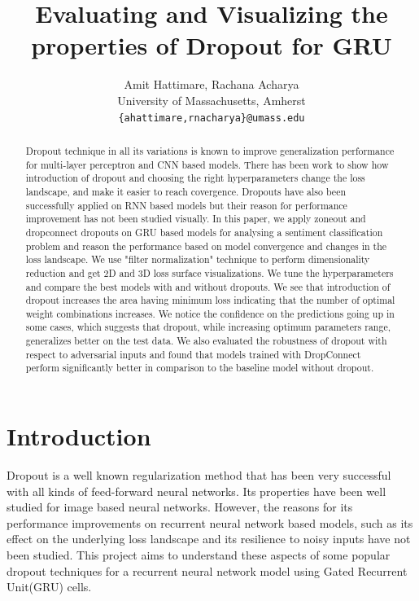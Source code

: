 \documentclass{article}
\title{Evaluating and Visualizing the properties of Dropout for GRU}
\author{%
  Amit Hattimare, Rachana Acharya \\
  University of Massachusetts, Amherst \\
  \texttt{\{ahattimare,rnacharya\}@umass.edu} \\
}
\begin{document}
\maketitle

\begin{abstract}
  Dropout technique in all its variations is known to improve generalization performance for multi-layer perceptron and CNN based models. There has been work to show how introduction of dropout and choosing the right hyperparameters change the loss landscape, and make it easier to reach covergence. Dropouts have also been successfully applied on RNN based models but their reason for performance improvement has not been studied visually. In this paper, we apply zoneout and dropconnect dropouts on GRU based models for analysing a sentiment classification problem and reason the performance based on model convergence and changes in the loss landscape. We use "filter normalization" technique to perform dimensionality reduction and get 2D and 3D loss surface visualizations. We tune the hyperparameters and compare the best models with and without dropouts. We see that introduction of dropout increases the area having minimum loss indicating that the number of optimal weight combinations increases. We notice the confidence on the predictions going up in some cases, which suggests that dropout, while increasing optimum parameters range, generalizes better on the test data. We also evaluated the robustness of dropout with respect to adversarial inputs and found that models trained with DropConnect perform significantly better in comparison to the baseline model without dropout. 
\end{abstract}

\section{Introduction}
Dropout is a well known regularization method that has been very successful with all kinds of feed-forward neural networks. Its properties have been well studied for image based neural networks. However, the reasons for its performance improvements on recurrent neural network based models, such as its effect on the underlying loss landscape and its resilience to noisy inputs have not been studied. This project aims to understand these aspects of some popular dropout techniques for a recurrent neural network model using Gated Recurrent Unit(GRU) cells. 
\end{document}
